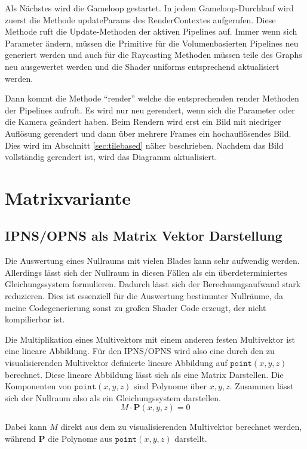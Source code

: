 \documentclass[
	ngerman,%
	accentcolor=9c,%
	ruledheaders=section,%
	class=report,%
	thesis={type=bachelor},%
	fontsize=11pt,%
	parskip=half-,%
	custommargins=true,%
	marginpar=false,%
]{tudapub}
\begin{document}
Als Nächstes wird die Gameloop gestartet.
In jedem Gameloop-Durchlauf wird zuerst die Methode updateParams des RenderContextes aufgerufen. Diese Methode ruft die Update-Methoden der aktiven Pipelines auf. Immer wenn sich Parameter ändern, müssen die Primitive für die Volumenbasierten Pipelines neu generiert werden und auch für die Raycasting Methoden müssen teile des Graphs neu ausgewertet werden und die Shader uniforms entsprechend aktualisiert werden. 

Dann kommt die Methode \enquote{render} welche die entsprechenden render Methoden der Pipelines aufruft. Es wird nur neu gerendert, wenn sich die Parameter oder die Kamera geändert haben.
Beim Rendern wird erst ein Bild mit niedriger Auflösung gerendert und dann über mehrere Frames ein hochauflösendes Bild. Dies wird im Abschnitt \ref{sec:tilebased} näher beschrieben.
Nachdem das Bild vollständig gerendert ist, wird das Diagramm aktualisiert.

\section{Matrixvariante}


\subsection{IPNS/OPNS als Matrix Vektor Darstellung}
Die Auswertung eines Nullraums mit vielen Blades kann sehr aufwendig werden. Allerdings lässt sich der Nullraum in diesen Fällen als ein überdeterminiertes Gleichungssystem formulieren. Dadurch lässt sich der Berechnungsaufwand stark reduzieren. Dies ist essenziell für die Auswertung bestimmter Nullräume, da meine Codegenerierung sonst zu großen Shader Code erzeugt, der nicht kompilierbar ist.  

Die Multiplikation eines Multivektors mit einem anderen festen Multivektor ist eine lineare Abbildung.
Für den IPNS/OPNS wird also eine durch den zu visualisierenden Multivektor definierte lineare Abbildung auf \(\texttt{point}(x,y,z)\) berechnet.
Diese lineare Abbildung lässt sich als eine Matrix Darstellen.
Die Komponenten von \(\texttt{point}(x,y,z)\) sind Polynome über \(x, y, z\).
Zusammen lässt sich der Nullraum also als ein Gleichungssystem darstellen.
\[
M \cdot \mathbf{P}(x,y,z) = 0
\]  

Dabei kann \(M\) direkt aus dem zu visualisierenden Multivektor berechnet werden, während \( \mathbf{P}\) die Polynome aus \(\texttt{point}(x,y,z)\) darstellt. 
\end{document}
